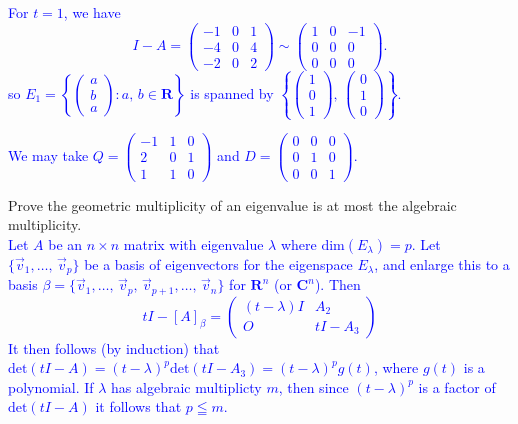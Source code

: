 \documentclass[a4paper,11pt]{article}
\newcommand{\R}{\mathbf{R}}
\newcommand{\C}{\mathbf{C}}
\newcommand{\ddim}{\text{dim}}
\newcommand{\ddet}{\text{det}}
\newcommand{\blue}[1]{\textcolor{blue}{#1}}
\begin{document}
\begin{enumerate}[(a)]
\blue{For $t=1$, we have
  \[
    I-A =
    \left(
      \begin{array}{rrr}
        -1&0&1\\
        -4&0&4\\
        -2&0&2
      \end{array}
    \right)
    \sim
    \left(
      \begin{array}{rrr}
        1&0&-1\\
        0&0&0\\
        0&0&0
      \end{array}
    \right).
  \]
  so $E_1=\left\{ \left( \begin{smallmatrix}a\\b\\a\end{smallmatrix} \right) :
    a,\,b \in \R \right\}$ is spanned by $\left\{
    \left( \begin{smallmatrix}1\\0\\1\end{smallmatrix}
    \right),\,\left( \begin{smallmatrix}0\\1\\0\end{smallmatrix} \right)
  \right\}$.}

\blue{We may take
  $Q=\left( \begin{smallmatrix}-1&1&0\\2&0&1\\1&1&0\end{smallmatrix} \right)$
  and $D=\left( \begin{smallmatrix}0&0&0\\0&1&0\\0&0&1\end{smallmatrix}
  \right)$. \\}
\end{enumerate}

 Prove the geometric multiplicity of an eigenvalue
is at most the algebraic multiplicity. \\

\blue{Let $A$ be an $n \times n$ matrix with eigenvalue $\lambda$ where
  $\ddim(E_\lambda) = p$. Let $\{\vec v_1, \dots,\,\vec v_p\}$ be a basis of
  eigenvectors for the eigenspace $E_\lambda$, and enlarge this to a basis
  $\beta=\{\vec v_1,\dots,\,\vec v_p,\,\vec v_{p+1},\dots,\,\vec v_n\}$ for
  $\R^n$ (or $\C^n$). Then
  \[
    tI - [A]_\beta=
    \begin{pmatrix}
      (t-\lambda)I & A_2 \\ O & tI - A_3
    \end{pmatrix}
  \]
  It then follows (by induction) that $\ddet(tI-A) =
  (t-\lambda)^p\ddet(tI-A_3)=(t-\lambda)^pg(t)$, where $g(t)$ is a polynomial.
  If $\lambda$ has algebraic multiplicty $m$, then since $(t-\lambda)^p$ is a
  factor of $\ddet(tI-A)$ it follows that $p \leqq m$. \\}
\end{document}
